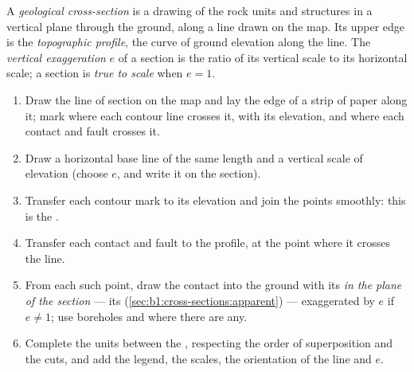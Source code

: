\begin{definition}\label{def:b1:cross-sections:section}
A \emph{geological cross-section} is a
drawing of the rock units and structures in a vertical plane through the
ground, along a line drawn on the map. Its upper edge is the
\emph{topographic profile}, the curve of ground
elevation along the line. The \emph{vertical
exaggeration} $e$ of a section is the ratio of
its vertical scale to its horizontal scale; a section is \emph{true to
scale} when $e = 1$.
\end{definition}

\begin{method}\label{met:b1:cross-sections:construct}
\begin{enumerate}
  \item Draw the line of section on the map and lay the edge of a strip of
        paper along it; mark where each contour line crosses it, with its
        elevation, and where each contact and fault crosses it.
  \item Draw a horizontal base line of the same length and a vertical scale
        of elevation (choose $e$, and write it on the section).
  \item Transfer each contour mark to its elevation and join the points
        smoothly: this is the .
  \item Transfer each contact and fault to the profile, at the point where it
        crosses the line.
  \item From each such point, draw the contact into the ground with its
         \emph{in the plane of the section} --- its 
        (\cref{sec:b1:cross-sections:apparent}) --- exaggerated by $e$ if
        $e \ne 1$; use boreholes and  where there are any.
  \item Complete the units between the , respecting the order of
        superposition and the cuts, and add the legend, the scales, the
        orientation of the line and $e$.
\end{enumerate}
\end{method}

